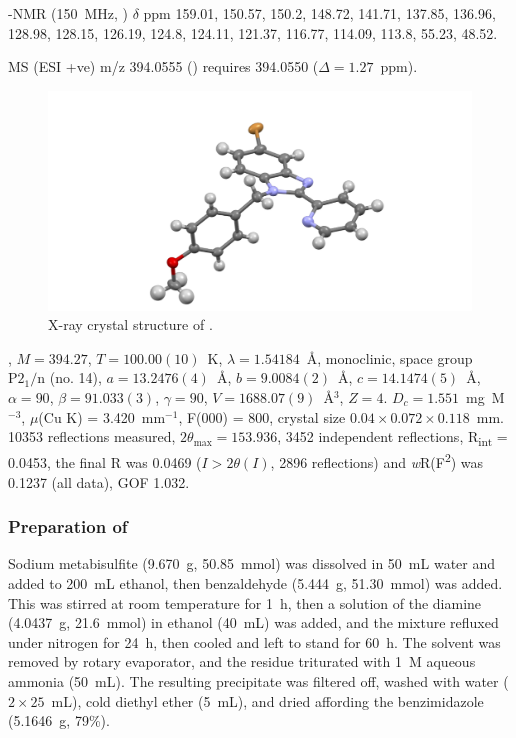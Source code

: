 \begin{refsection}
\begin{enumerate}
    -NMR (150~MHz, ) $\delta$ ppm 159.01, 150.57, 150.2, 148.72, 141.71, 137.85, 136.96, 128.98, 128.15, 126.19, 124.8, 124.11, 121.37, 116.77, 114.09, 113.8, 55.23, 48.52.
    
\end{enumerate}

MS (ESI +ve) m/z 394.0555 ()  requires 394.0550 ($\Delta=1.27$~ppm).

\begin{figure}
    \includegraphics[width=0.8\linewidth]{Figures/rhs-bromo-2py-pmb-xtal.pdf}
    \caption{X-ray crystal structure of .}
\end{figure}

, $M=394.27$, $T=100.00(10)$~K, $\lambda=1.54184$~\AA, monoclinic, space group $\text{P}2_1/\text{n}$ (no. 14), $a = 13.2476(4)$~\AA, $b = 9.0084(2)$~\AA, $c = 14.1474(5)$~\AA, $\alpha = 90$\degree, $\beta = 91.033(3)$\degree, $\gamma = 90$\degree, $V = 1688.07(9)$~\AA$^{3}$, $Z = 4$. $D_{c}= 1.551$~mg~M$^{-3}$, $\mu$(Cu K\a) = 3.420~mm$^{-1}$, F(000) = 800, crystal size $0.04 \times 0.072 \times 0.118$~mm. 10353 reflections measured, $2\theta_{\max}=153.936$\degree, 3452 independent reflections, R\textsubscript{int} = 0.0453, the final R was 0.0469 ($I > 2\theta(I)$, 2896 reflections) and \emph{w}R(F\textsuperscript{2}) was 0.1237 (all data), GOF 1.032. 

\subsubsection{Preparation of }
Sodium metabisulfite (9.670~g, 50.85~mmol) was dissolved in 50~mL water and added to 200~mL ethanol, then benzaldehyde (5.444~g, 51.30~mmol) was added.
This was stirred at room temperature for 1~h, then a solution of the diamine  (4.0437~g, 21.6~mmol) in ethanol (40~mL) was added, and the mixture refluxed under nitrogen for 24~h, then cooled and left to stand for 60~h.
The solvent was removed by rotary evaporator, and the residue triturated with 1~M aqueous ammonia (50~mL). 
The resulting precipitate was filtered off, washed with water ($2\times25$~mL), cold diethyl ether (5~mL), and dried affording the benzimidazole  (5.1646~g, 79\%).\autocite{Kim2011}


\end{refsection}

